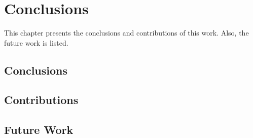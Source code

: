 
\chapter{Conclusions}
\label{chap:05-conclusions}
\thispagestyle{empty}

This chapter presents the conclusions and contributions of this work. Also, the future work is listed.

\section{Conclusions}

\section{Contributions}

\section{Future Work}


